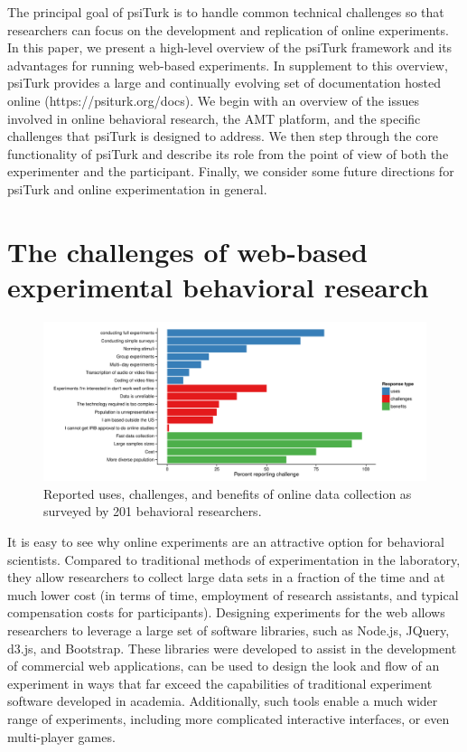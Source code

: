 \documentclass[twocolumn]{svjour3}          %
\newcommand{\psiturk}[0]{\textsf{psiTurk}}
\begin{document}
The principal goal of \psiturk{} is to handle common technical 
challenges so that researchers can focus on the development and replication
of online experiments.  In this paper, we present a high-level overview of the 
\psiturk{} framework and its advantages for running web-based experiments.
In supplement to this overview, \psiturk{} provides a large and continually
evolving set of documentation hosted online (\textsf{https://psiturk.org/docs}).
We begin with an overview of the issues involved in online 
behavioral research,  the AMT platform, and the specific challenges that \psiturk{} is designed to 
address.  We then  step through the core functionality of \psiturk{} and 
describe its role from the point of view of both the experimenter and the participant.  Finally, we
consider some future directions for \psiturk{} and online experimentation in 
general.



\section{The challenges of web-based experimental behavioral research}

\begin{figure}[tp]
\centering
\includegraphics[width=\textwidth]{figures/combinedquestions2.pdf}
\caption{Reported uses, challenges, and benefits of online data collection as surveyed
by 201 behavioral researchers.}
\label{fig:survey}
\end{figure}

It is easy to see why online experiments are an attractive option for behavioral 
scientists.  Compared to traditional methods of experimentation in the laboratory,
they allow researchers to collect large data sets in a fraction of the time and at 
much lower cost (in terms of time, employment of research assistants, and typical 
compensation costs for participants).  Designing experiments for the web allows 
researchers to leverage a large set of software libraries, such as Node.js, JQuery, d3.js, 
and Bootstrap. These libraries were developed to assist 
in the development of commercial web applications, can be used to design the look and flow of an 
experiment in ways 
that far exceed the capabilities of traditional experiment software developed 
in academia.  Additionally, such tools enable a much wider range of experiments, 
including more complicated interactive interfaces, or even multi-player games.
\end{document}
